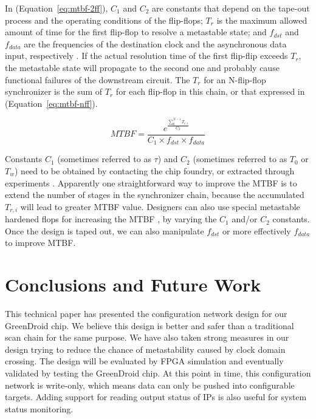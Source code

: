\documentclass[12pt]{article}
\newcommand{\refeq}[1]{(Equation~\ref{#1})}
\begin{document}
In \refeq{eq:mtbf-2ff}, $C_1$ and $C_2$ are constants that depend on the
tape-out process and the operating conditions of the flip-flops; $T_r$ is
the maximum allowed amount of time for the first flip-flop to resolve a metastable
state; and $f_{dst}$ and $f_{data}$ are the frequencies of the destination
clock and the asynchronous data input, respectively \cite{cadence2004tp}. If the
actual resolution time of the first flip-flip exceeds $T_r$, the
metastable state will propagate to the second one and probably cause functional
failures of the downstream circuit. The $T_r$ for an N-flip-flop
synchronizer is the sum of $T_r$ for each flip-flop in this chain, or that
expressed in \refeq{eq:mtbf-nff}.

\begin{equation} \label{eq:mtbf-nff}
MTBF = \frac{e^{\frac{\sum_{0}^{N - 1} T_{r,i}}{C_2}}} {C_1 \times f_{dst} \times f_{data}}
\end{equation}

Constants $C_1$ (sometimes referred to as $\tau$) and $C_2$ (sometimes referred
to as $T_0$ or $T_w$) need to be obtained by contacting the chip foundry, or
extracted through experiments \cite{baghini2002impact} \cite{chen2010fpga}.
Apparently one straightforward way to improve the MTBF is to extend the number
of stages in the synchronizer chain, because the accumulated $T_{r,i}$ will
lead to greater MTBF value. Designers can also use special metastable hardened
flops for increasing the MTBF \cite{cadence2004tp}, by varying the $C_1$
and/or $C_2$ constants. Once the design is taped out, we can also manipulate
$f_{dst}$ or more effectively $f_{data}$ to improve MTBF.

\section{Conclusions and Future Work} \label{conclusions}
This technical paper has presented the configuration network design for our
GreenDroid chip. We believe this design is better and safer than a traditional
scan chain for the same purpose. We have also taken strong measures in our
design trying to reduce the chance of metastability caused by clock domain
crossing. The design will be evaluated by FPGA simulation and eventually
validated by testing the GreenDroid chip. At this point in time, this
configuration network is write-only, which means data can only be pushed into
configurable targets. Adding support for reading output status of IPs is also
useful for system status monitoring.



\end{document}
